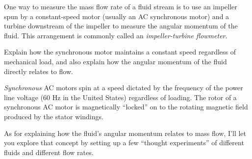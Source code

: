 

One way to measure the mass flow rate of a fluid stream is to use an impeller spun by a constant-speed motor (usually an AC synchronous motor) and a turbine downstream of the impeller to measure the angular momentum of the fluid.  This arrangement is commonly called an {\it impeller-turbine flowmeter}.  

Explain how the synchronous motor maintains a constant speed regardless of mechanical load, and also explain how the angular momentum of the fluid directly relates to flow.







{\it Synchronous} AC motors spin at a speed dictated by the frequency of the power line voltage (60 Hz in the United States) regardless of loading.  The rotor of a synchronous AC motor is magnetically ``locked'' on to the rotating magnetic field produced by the stator windings.

As for explaining how the fluid's angular momentum relates to mass flow, I'll let you explore that concept by setting up a few ``thought experiments'' of different fluids and different flow rates.












